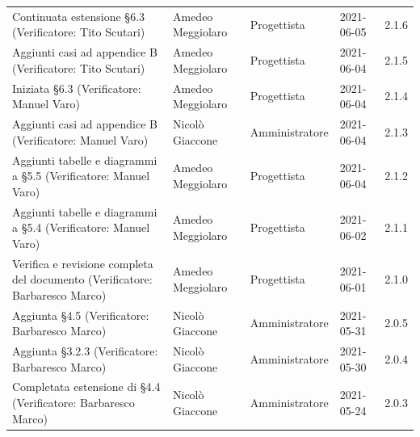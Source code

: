 \documentclass[a4paper]{article}
\begin{document}
\begin{center}
\begin{table}[h!]
\begin{tabular}{p{160px} p{90px} p{70px} p{55px} p{45px}}
            Continuata estensione \S 6.3 \newline(Verificatore: Tito Scutari)                                       & Amedeo Meggiolaro & Progettista    & 2021-06-05    & 2.1.6             \\
            Aggiunti casi ad appendice B \newline(Verificatore: Tito Scutari)                                       & Amedeo Meggiolaro & Progettista    & 2021-06-04    & 2.1.5             \\
            Iniziata \S 6.3 \newline(Verificatore: Manuel Varo)                                                     & Amedeo Meggiolaro & Progettista    & 2021-06-04    & 2.1.4             \\
            Aggiunti casi ad appendice B \newline(Verificatore: Manuel Varo)                                        & Nicolò Giaccone   & Amministratore   & 2021-06-04    & 2.1.3           \\
            Aggiunti tabelle e diagrammi a \S 5.5 \newline(Verificatore: Manuel Varo)                               & Amedeo Meggiolaro & Progettista    & 2021-06-04    & 2.1.2             \\
            Aggiunti tabelle e diagrammi a \S 5.4 \newline(Verificatore: Manuel Varo)                               & Amedeo Meggiolaro & Progettista    & 2021-06-02    & 2.1.1             \\
            Verifica e revisione completa del documento \newline(Verificatore: Barbaresco Marco)                    & Amedeo Meggiolaro & Progettista    & 2021-06-01    & 2.1.0             \\
            Aggiunta \S 4.5 \newline(Verificatore: Barbaresco Marco)                                                & Nicolò Giaccone   & Amministratore   & 2021-05-31    & 2.0.5           \\
            Aggiunta \S 3.2.3 \newline(Verificatore: Barbaresco Marco)                                              & Nicolò Giaccone   & Amministratore   & 2021-05-30    & 2.0.4           \\
            Completata estensione di \S 4.4   \newline(Verificatore: Barbaresco Marco)                              & Nicolò Giaccone   & Amministratore   & 2021-05-24    & 2.0.3           \\

\end{tabular}
\end{table}
\end{center}
\end{document}

